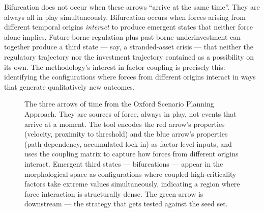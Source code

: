 \documentclass[11pt,a4paper]{article}
\begin{document}
Bifurcation does not occur when these arrows ``arrive at the same time''. They are always all in play simultaneously. Bifurcation occurs when forces arising from different temporal origins \emph{interact} to produce emergent states that neither force alone implies. Future-borne regulation plus past-borne underinvestment can together produce a third state — say, a stranded-asset crisis — that neither the regulatory trajectory nor the investment trajectory contained as a possibility on its own. The methodology's interest in factor coupling is precisely this: identifying the configurations where forces from different origins interact in ways that generate qualitatively new outcomes.

\begin{figure}[H]
\centering
{}
\caption{The three arrows of time from the Oxford Scenario Planning Approach. They are sources of force, always in play, not events that arrive at a moment. The tool encodes the red arrow's properties (velocity, proximity to threshold) and the blue arrow's properties (path-dependency, accumulated lock-in) as factor-level inputs, and uses the coupling matrix to capture how forces from different origins interact. Emergent third states — bifurcations — appear in the morphological space as configurations where coupled high-criticality factors take extreme values simultaneously, indicating a region where force interaction is structurally dense. The green arrow is downstream — the strategy that gets tested against the seed set.}
\end{figure}
\end{document}
